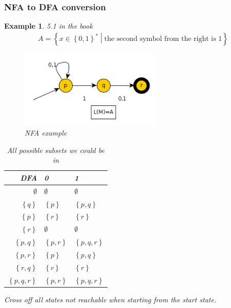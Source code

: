 \documentclass[a4paper]{article}
\newtheorem{example}{Example}
\begin{document}
\subsubsection{NFA to DFA conversion}
\begin{example}
    5.1 in the book\\
    \begin{align*}
        A=\left\{ x\in\left\{ 0,1 \right\}^* \middle | 
        \mbox{the second symbol from the right is 1} \right\}
    \end{align*}
    \begin{figure}[H]
        \centering
        \includegraphics[width=0.6\textwidth]{example5-1-1.png}
        \caption{NFA example}
    \end{figure}
    \begin{table}[H]
        \centering
        \begin{tabular}{r|l l}
            DFA & 0 & 1 \\\hline
            $\emptyset$ & $\emptyset$ & $\emptyset$\\
            $\left\{ q \right\}$ & $\left\{ p \right\}$ & $\left\{ p,q \right\}$\\
            $\left\{ p \right\}$ & $\left\{ r \right\}$ & $\left\{ r \right\}$\\
            $\left\{ r \right\}$ & $\emptyset$ & $\emptyset$\\
            $\left\{ p,q \right\}$ & $\left\{ p,r \right\}$ & $\left\{ p,q,r \right\}$\\
            $\left\{ p,r \right\}$ & $\left\{ p \right\}$ & $\left\{ p,q \right\}$\\
            $\left\{ r,q \right\}$ & $\left\{ r \right\}$ & $\left\{ r \right\}$\\
            $\left\{ p,q,r \right\}$ & $\left\{ p,r \right\}$ & $\left\{ p,q,r \right\}$
        \end{tabular}
        \caption{All possible subsets we could be in}
    \end{table}
    Cross off all states not reachable when starting from the start state.

\end{example}
\end{document}
